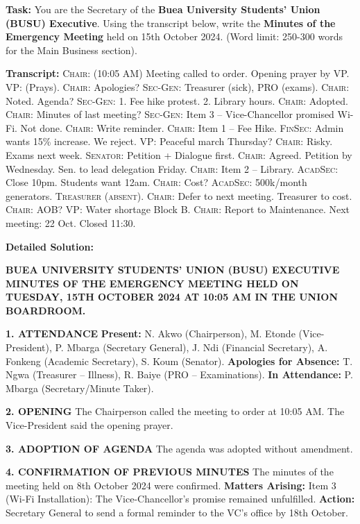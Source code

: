 \documentclass[11pt]{article}
\begin{document}
\begin{exoresolu}
\textbf{Task:} You are the Secretary of the \textbf{Buea University Students' Union (BUSU) Executive}. Using the transcript below, write the \textbf{Minutes of the Emergency Meeting} held on 15th October 2024. (Word limit: 250-300 words for the Main Business section).

\textbf{Transcript:}
\textsc{Chair}: (10:05 AM) Meeting called to order. Opening prayer by VP.
\textsc{VP}: (Prays).
\textsc{Chair}: Apologies? \textsc{Sec-Gen}: Treasurer (sick), PRO (exams). \textsc{Chair}: Noted. Agenda? \textsc{Sec-Gen}: 1. Fee hike protest. 2. Library hours. \textsc{Chair}: Adopted.
\textsc{Chair}: Minutes of last meeting? \textsc{Sec-Gen}: Item 3 -- Vice-Chancellor promised Wi-Fi. Not done. \textsc{Chair}: Write reminder.
\textsc{Chair}: Item 1 -- Fee Hike. \textsc{FinSec}: Admin wants 15\% increase. We reject. \textsc{VP}: Peaceful march Thursday? \textsc{Chair}: Risky. Exams next week. \textsc{Senator}: Petition + Dialogue first. \textsc{Chair}: Agreed. Petition by Wednesday. Sen. to lead delegation Friday.
\textsc{Chair}: Item 2 -- Library. \textsc{AcadSec}: Close 10pm. Students want 12am. \textsc{Chair}: Cost? \textsc{AcadSec}: 500k/month generators. \textsc{Treasurer (absent)}. \textsc{Chair}: Defer to next meeting. Treasurer to cost.
\textsc{Chair}: AOB? \textsc{VP}: Water shortage Block B. \textsc{Chair}: Report to Maintenance. Next meeting: 22 Oct. Closed 11:30.

\tcblower
\textbf{Detailed Solution:}

\textbf{BUEA UNIVERSITY STUDENTS' UNION (BUSU) EXECUTIVE}
\textbf{MINUTES OF THE EMERGENCY MEETING HELD ON TUESDAY, 15TH OCTOBER 2024 AT 10:05 AM IN THE UNION BOARDROOM.}

\textbf{1. ATTENDANCE}
\textbf{Present:} N. Akwo (Chairperson), M. Etonde (Vice-President), P. Mbarga (Secretary General), J. Ndi (Financial Secretary), A. Fonkeng (Academic Secretary), S. Koum (Senator).
\textbf{Apologies for Absence:} T. Ngwa (Treasurer -- Illness), R. Baiye (PRO -- Examinations).
\textbf{In Attendance:} P. Mbarga (Secretary/Minute Taker).

\textbf{2. OPENING}
The Chairperson called the meeting to order at 10:05 AM. The Vice-President said the opening prayer.

\textbf{3. ADOPTION OF AGENDA}
The agenda was adopted without amendment.

\textbf{4. CONFIRMATION OF PREVIOUS MINUTES}
The minutes of the meeting held on 8th October 2024 were confirmed. \textbf{Matters Arising:} Item 3 (Wi-Fi Installation): The Vice-Chancellor's promise remained unfulfilled. \textbf{Action:} Secretary General to send a formal reminder to the VC's office by 18th October.


\end{exoresolu}
\end{document}

